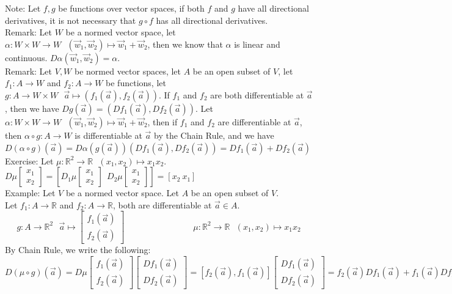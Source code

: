 \documentclass[11pt,oneside]{book}
\theoremstyle{break}
\theoremstyle{break}
\newcommand{\R}{\mathbb{R}}
\newcommand{\note}{\color{red}Note: \color{black}}
\newcommand{\remark}{\color{blue}Remark: \color{black}}
\newcommand{\example}{\color{green}Example: \color{black}}
\newcommand{\exercise}{\color{green}Exercise: \color{black}}
\begin{document}
\note Let $f,g$ be functions over vector spaces, if both $f$ and $g$ have all directional derivatives, it is not necessary that $g\circ f$ has all directional derivatives.\\

\remark Let $W$ be a normed vector space, let $\alpha:W\times W \to W \ \ \ (\vec{w}_1,\vec{w}_2)\mapsto \vec{w}_1+\vec{w}_2$, then we know that $\alpha$ is linear and continuous. $D\alpha (\vec{w}_1,\vec{w}_2) = \alpha$.\\

\remark Let $V,W$ be normed vector spaces, let $A$ be an open subset of $V$, let $f_1:A \to W$ and $f_2:A \to W$ be functions, let $g:A \to W\times W \ \ \ \vec{a}\mapsto (f_1(\vec{a}),f_2(\vec{a}))$. If $f_1$ and $f_2$ are both differentiable at $\vec{a}$, then we have $Dg(\vec{a}) = (Df_1(\vec{a}),Df_2(\vec{a}))$. Let $\alpha:W\times W \to W \ \ \ (\vec{w}_1,\vec{w}_2)\mapsto \vec{w}_1+\vec{w}_2$, then if $f_1$ and $f_2$ are differentiable at $\vec{a}$, then $\alpha\circ g: A \to W$ is differentiable at $\vec{a}$ by the Chain Rule, and we have $D(\alpha \circ g)(\vec{a})=D\alpha(g(\vec{a}))(Df_1(\vec{a}),Df_2(\vec{a})) = Df_1(\vec{a})+Df_2(\vec{a})$ \\

\exercise Let $\mu:\R^2 \to \R\ \ \ (x_1,x_2)\mapsto x_1x_2$. $D\mu
\begin{bmatrix} x_1\\ x_2 \end{bmatrix} = \left[
D_1\mu\begin{bmatrix}x_1\\ x_2\end{bmatrix} \ \ D_2\mu\begin{bmatrix}x_1\\ x_2\end{bmatrix}\right] = [x_2\ x_1]$\\

\example Let $V$ be a normed vector space. Let $A$ be an open subset of $V$.\\ Let $f_1:A \to \R$ and $f_2: A \to \R$, both are differentiable at $\vec{a}\in A$. 
$$g:A \to \R^2 \ \ \ \vec{a}\mapsto \begin{bmatrix}
f_1(\vec{a}) \\ f_2(\vec{a})
\end{bmatrix} \qquad\qquad\qquad\qquad \mu:\R^2 \to \R\ \ \ (x_1,x_2)\mapsto x_1x_2$$
By Chain Rule, we write the following:
$$D(\mu\circ g)(\vec{a})=D\mu \begin{bmatrix}
f_1(\vec{a}) \\ f_2(\vec{a})
\end{bmatrix} \begin{bmatrix}
Df_1(\vec{a})\\ Df_2(\vec{a})
\end{bmatrix} =[f_2(\vec{a}),f_1(\vec{a})]\begin{bmatrix}
Df_1(\vec{a})\\ Df_2(\vec{a})
\end{bmatrix} = f_2(\vec{a})Df_1(\vec{a})+f_1(\vec{a})Df_2(\vec{a})
$$
\end{document}
